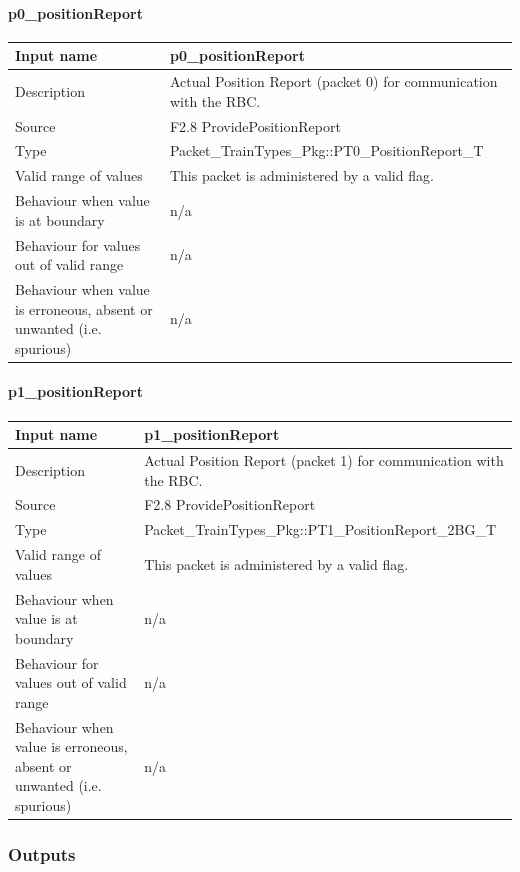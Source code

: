 \paragraph{p0\_positionReport}

\begin{longtable}{p{}p{}}
\toprule
Input name				& p0\_positionReport\\
\midrule
Description				& Actual Position Report (packet 0) for communication with the RBC.
\\
\midrule
Source					& F2.8 ProvidePositionReport\\ 
\midrule
Type					& Packet\_TrainTypes\_Pkg::PT0\_PositionReport\_T\\
\midrule
Valid range of values	& This packet is administered by a valid flag.\\
\midrule
Behaviour when value is at boundary	& n/a\\
\midrule
Behaviour for values out of valid range	& n/a\\
\midrule
Behaviour when value is erroneous, absent or unwanted (i.e. spurious) & n/a\\
\bottomrule
\end{longtable}

\paragraph{p1\_positionReport}

\begin{longtable}{p{}p{}}
\toprule
Input name				& p1\_positionReport\\
\midrule
Description				& Actual Position Report (packet 1) for communication with the RBC.
\\
\midrule
Source					& F2.8 ProvidePositionReport\\  
\midrule
Type					& Packet\_TrainTypes\_Pkg::PT1\_PositionReport\_2BG\_T\\
\midrule
Valid range of values	& This packet is administered by a valid flag.\\
\midrule
Behaviour when value is at boundary	& n/a\\
\midrule
Behaviour for values out of valid range	& n/a\\
\midrule
Behaviour when value is erroneous, absent or unwanted (i.e. spurious) & n/a\\
\bottomrule
\end{longtable}

\subsubsection{Outputs}\label{s:traindata_outputs}


